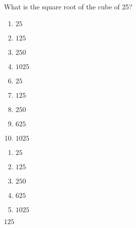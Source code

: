 


 What is the square root of the cube of 25?


\ifsat
	\begin{enumerate}[label=\Alph*)]
		\item   $25$
		\item  $125$%
		\item $250$
		\item  $1025$
	\end{enumerate}
\else
\fi

\ifacteven
	\begin{enumerate}[label=\textbf{\Alph*.},itemsep=\fill,align=left]
		\setcounter{enumii}{5}
		\item   $25$
		\item  $125$%
		\item $250$
		\addtocounter{enumii}{1}
		\item $625$
		\item  $1025$
	\end{enumerate}
\else
\fi

\ifactodd
	\begin{enumerate}[label=\textbf{\Alph*.},itemsep=\fill,align=left]
		\item   $25$
		\item  $125$%
		\item $250$
		\item $625$
		\item  $1025$
	\end{enumerate}
\else
\fi

\ifgridin
  $125$%
		
\else
\fi

